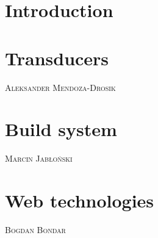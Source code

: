 \documentclass[oneside,english,logo]{amuthesis}
\makeatletter
\newcommand{\chapterauthor}[1]{%
	{\centering\vspace*{-25pt}%
		\linespread{1.1}\large\scshape#1%
		\par\nobreak\vspace*{35pt}}
	\@afterheading%
}
\makeatother
\begin{document}
	
	
	\tableofcontents
	
	
	\chapter{Introduction}
	
	
	
	\chapter{Transducers}
	\chapterauthor{Aleksander Mendoza-Drosik}
	
	
	\chapter{Build system}
	\chapterauthor{Marcin Jabłoński}	
	
	
	\chapter{Web technologies}
	\chapterauthor{Bogdan Bondar}	
	
	
	
	
\end{document}
